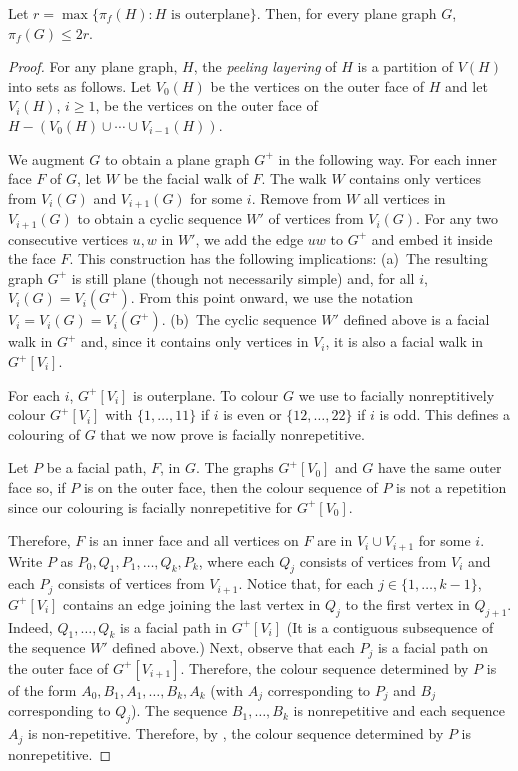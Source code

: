 \documentclass{patmorin}
\begin{document}
\begin{thm}
   Let $r=\max\{\pi_f(H):\text{$H$ is outerplane}\}$.  Then, for every
   plane graph $G$, $\pi_f(G)\le 2r$.
\end{thm}

\begin{proof}
   For any plane graph, $H$, the \emph{peeling layering} of $H$ is
   a partition of $V(H)$ into sets as follows.  Let $V_0(H)$ be the
   vertices on the outer face of $H$ and let $V_i(H)$, $i\ge 1$, be the
   vertices on the outer face of $H-(V_0(H)\cup\cdots\cup V_{i-1}(H))$.

   We augment $G$ to obtain a plane graph $G^+$ in the following way.
   For each inner face $F$ of $G$, let $W$ be the facial walk of $F$.
   The walk $W$ contains only vertices from $V_i(G)$ and $V_{i+1}(G)$
   for some $i$.  Remove from $W$ all vertices in $V_{i+1}(G)$ to
   obtain a cyclic sequence $W'$ of vertices from $V_i(G)$.  For any
   two consecutive vertices $u,w$ in $W'$, we add the edge $uw$
   to $G^+$ and embed it inside the face $F$. This construction has
   the following implications: (a)~The resulting graph $G^+$
   is still plane (though not necessarily simple) and, for all
   $i$, $V_i(G)=V_i(G^+)$. From this point onward, we use the notation
   $V_i=V_i(G)=V_i(G^+)$.
   (b)~The cyclic sequence $W'$ defined above is a facial walk
   in $G^+$ and, since it contains only vertices in $V_i$, it is also
   a facial walk in $G^+[V_i]$.

   For each $i$, $G^+[V_i]$ is outerplane.  To colour $G$ we use
    to facially nonreptitively colour $G^+[V_i]$ with
   $\{1,\ldots,11\}$ if $i$ is even or $\{12,\ldots,22\}$ if $i$ is odd.
   This defines a colouring of $G$ that we now prove is facially
   nonrepetitive.

   Let $P$ be a facial path, $F$, in $G$. The graphs $G^+[V_0]$ and $G$
   have the same outer face so, if $P$ is on the outer face,
   then the colour sequence of $P$ is not a repetition
   since our colouring is facially nonrepetitive for $G^+[V_0]$.

   Therefore, $F$ is an inner face and all vertices on $F$ are in $V_i\cup
   V_{i+1}$ for some $i$.  Write $P$ as $P_0,Q_1,P_1,\ldots,Q_k,P_k$,
   where each $Q_j$ consists of vertices from $V_i$ and each $P_j$
   consists of vertices from $V_{i+1}$.  Notice that, for each
   $j\in\{1,\ldots,k-1\}$, $G^+[V_i]$ contains an edge joining the
   last vertex in $Q_j$ to the first vertex in $Q_{j+1}$.  Indeed,
   $Q_{1},\ldots,Q_k$ is a facial path in $G^+[V_i]$ (It is a contiguous
   subsequence of the sequence $W'$ defined above.)  Next, observe that
   each $P_j$ is a facial path on the outer face of $G^+[V_{i+1}]$.
   Therefore, the colour sequence determined by $P$ is of the form
   $A_0,B_1,A_1,\ldots,B_k,A_k$ (with $A_j$ corresponding to $P_j$
   and $B_j$ corresponding to $Q_j$).  The sequence $B_1,\ldots,B_k$ is
   nonrepetitive and each sequence $A_j$ is non-repetitive.  Therefore,
   by , the colour sequence determined by $P$
   is nonrepetitive.
\end{proof}
\end{document}

